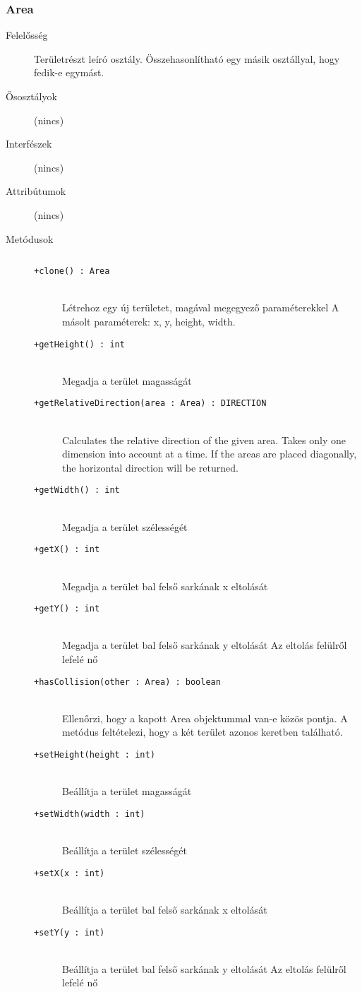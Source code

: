 		\subsubsection{Area}
			\begin{description}

				\item[Felelősség] Területrészt leíró osztály. Összehasonlítható egy másik osztállyal, hogy fedik-e egymást.

				\item[Ősosztályok] (nincs)
				\item[Interfészek] (nincs)
				\item[Attribútumok] (nincs)
				\item[Metódusok]$\ $
					\begin{description}
						\item[\texttt{+clone() : Area}] \hfill \\Létrehoz egy új területet, magával megegyező paraméterekkel    A másolt paraméterek: x, y, height, width. 
						\item[\texttt{+getHeight() : int}] \hfill \\Megadja a terület magasságát 
						\item[\texttt{+getRelativeDirection(area : Area) : DIRECTION}] \hfill \\Calculates the relative direction of the given area.    Takes only one dimension into account at a time.  If the areas are placed diagonally, the horizontal  direction will be returned. 
						\item[\texttt{+getWidth() : int}] \hfill \\Megadja a terület szélességét 
						\item[\texttt{+getX() : int}] \hfill \\Megadja a terület bal felső sarkának x eltolását 
						\item[\texttt{+getY() : int}] \hfill \\Megadja a terület bal felső sarkának y eltolását    Az eltolás felülről lefelé nő 
						\item[\texttt{+hasCollision(other : Area) : boolean}] \hfill \\Ellenőrzi, hogy a kapott Area objektummal van-e közös pontja.  A metódus feltételezi, hogy a két terület azonos keretben található. 
						\item[\texttt{+setHeight(height : int)}] \hfill \\Beállítja a terület magasságát 
						\item[\texttt{+setWidth(width : int)}] \hfill \\Beállítja a terület szélességét 
						\item[\texttt{+setX(x : int)}] \hfill \\Beállítja a terület bal felső sarkának x eltolását 
						\item[\texttt{+setY(y : int)}] \hfill \\Beállítja a terület bal felső sarkának y eltolását    Az eltolás felülről lefelé nő 
					\end{description}
			\end{description}

